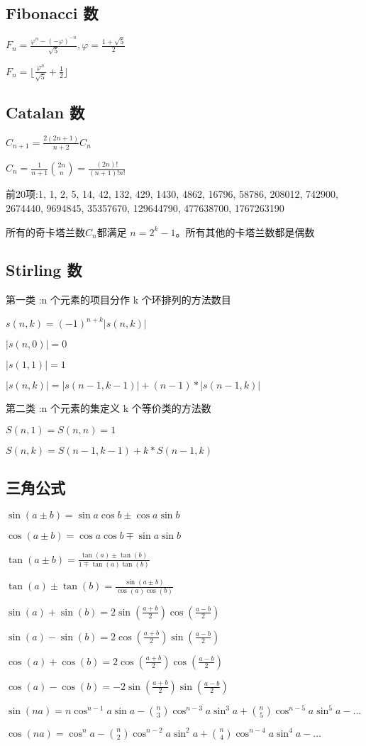 \subsection{Fibonacci 数}
$F_n=\frac{\varphi^{n}-(-\varphi)^{-n}}{\sqrt{5}},\varphi=\frac{1+\sqrt{5}}{2}$\par
$F_n=\lfloor \frac{\varphi^n}{\sqrt{5}}+\frac{1}{2}\rfloor$
\subsection{Catalan 数}
$C_{n+1}=\frac{2(2n+1)}{n+2}C_n$\par
$C_n=\frac{1}{n+1}\binom{2n}{n}=\frac{(2n)!}{(n+1)!n!}$\par
前20项:1, 1, 2, 5, 14, 42, 132, 429, 1430, 4862, 16796, 58786, 208012, 742900, 2674440, 9694845, 35357670, 129644790, 477638700, 1767263190\par
所有的奇卡塔兰数$C_n$都满足 $\displaystyle n=2^{k}-1$。所有其他的卡塔兰数都是偶数
\subsection{Stirling 数}
第一类 :n 个元素的项目分作 k 个环排列的方法数目\par
$s(n, k) = (-1)^{n+k}|s(n, k)|$\par
$|s(n, 0)| =0$\par
$|s(1, 1)| =1$\par
$|s(n, k)| =|s(n-1, k-1)|+(n-1)*|s(n-1, k)|$\par
第二类 :n 个元素的集定义 k 个等价类的方法数\par
$    S(n,1)=S(n,n)=1$\par
 $   S(n,k)=S(n-1,k-1)+k*S(n-1,k)$\par
\subsection{三角公式}
$\sin(a \pm b) = \sin a \cos b \pm \cos a \sin b$\par
$\cos(a \pm b) = \cos a \cos b \mp \sin a \sin b$\par
$\tan(a \pm b) = \frac{\tan(a)\pm\tan(b)}{1 \mp \tan(a)\tan(b)}$\par
$\tan(a) \pm \tan(b) = \frac{\sin(a \pm b)}{\cos(a)\cos(b)}$\par
$\sin(a) + \sin(b) = 2\sin(\frac{a + b}{2})\cos(\frac{a - b}{2})$\par
$\sin(a) - \sin(b) = 2\cos(\frac{a + b}{2})\sin(\frac{a - b}{2})$\par
$\cos(a) + \cos(b) = 2\cos(\frac{a + b}{2})\cos(\frac{a - b}{2})$\par
$\cos(a) - \cos(b) = -2\sin(\frac{a + b}{2})\sin(\frac{a - b}{2})$\par
$\sin(na) = n\cos^{n-1}a\sin a - \binom{n}{3}\cos^{n-3}a \sin^3a + \binom{n}{5}\cos^{n-5}a\sin^5a - \dots$\par
$\cos(na) = \cos^{n}a - \binom{n}{2}\cos^{n-2}a \sin^2a + \binom{n}{4}\cos^{n-4}a\sin^4a - \dots$\par

